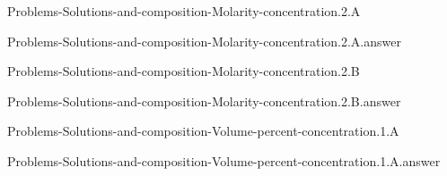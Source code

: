 \documentclass[main.tex]{subfiles}
\newcommand\chapterlabel{}
\begin{document}
\renewcommand\chapterlabel{Ch-electrolytes}
\begin{question}[ID=\the\value{numA}]
{Problems-Solutions-and-composition-Molarity-concentration.2.A}
\end{question}
   \begin{Form}
   \TextField[multiline,backgroundcolor=gray!20,borderwidth=0,width=0.43\textwidth  ,height=115pt, name=\the\value{numA}]  { }\end{Form}
\begin{solution}
{Problems-Solutions-and-composition-Molarity-concentration.2.A.answer}
\hspace{0.1cm}
\end{solution}


\renewcommand\chapterlabel{Ch-electrolytes}
\begin{question}[ID=\the\value{numA}]
{Problems-Solutions-and-composition-Molarity-concentration.2.B}
\end{question}
   \begin{Form}
   \TextField[multiline,backgroundcolor=gray!20,borderwidth=0,width=0.43\textwidth  ,height=115pt, name=\the\value{numA}]  { }\end{Form}
\begin{solution}
{Problems-Solutions-and-composition-Molarity-concentration.2.B.answer}
\hspace{0.1cm}
\end{solution}


\renewcommand\chapterlabel{Ch-electrolytes}
\begin{question}[ID=\the\value{numA}]
{Problems-Solutions-and-composition-Volume-percent-concentration.1.A}
\end{question}
   \begin{Form}
   \TextField[multiline,backgroundcolor=gray!20,borderwidth=0,width=0.43\textwidth  ,height=115pt, name=\the\value{numA}]  { }\end{Form}
\begin{solution}
{Problems-Solutions-and-composition-Volume-percent-concentration.1.A.answer}
\hspace{0.1cm}
\end{solution}
\end{document}
